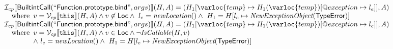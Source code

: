 \[\begin{array}{l}
\I _{cp}\lbr \SF{BuiltintCall}(``\SF{Function.prototype.bind}",args)\rbr(H,A)
 = (H_1[\varloc{temp}\mapsto H_1(\varloc{temp})[\varprop{exception}\mapsto l_e]], A) \\
\quad\wherec{
  v = \V _{cp}\lbr \TT{this}\rbr (H,A) \land v \not\in \SF{Loc}
  \land\ l_e = \hf{newLocation}() \land\ H_1=H[l_e\mapsto\hf{NewExceptionObject}(\SF{TypeError})] 
  }\\
  
\I _{cp}\lbr \SF{BuiltintCall}(``\SF{Function.prototype.bind}",args)\rbr(H,A)
 = (H_1[\varloc{temp}\mapsto H_1(\varloc{temp})[\varprop{exception}\mapsto l_e]], A) \\
\quad\wherec{
  v = \V _{cp}\lbr \TT{this}\rbr (H,A) \land v \in \SF{Loc} \land \neg \hf{IsCallable}(H,v)\\
  \land\ l_e = \hf{newLocation}() \land\ H_1=H[l_e\mapsto\hf{NewExceptionObject}(\SF{TypeError})] 
  }\\
  
\end{array}
\]


